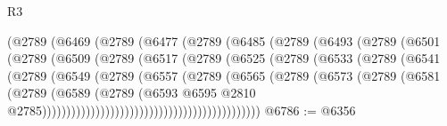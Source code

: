 \begin{lexlean}{R3}
\begin{coremodule}
                          (@2789
                            (@6469
                              (@2789
                                (@6477
                                  (@2789
                                    (@6485
                                      (@2789
                                        (@6493
                                          (@2789
                                            (@6501
                                              (@2789
                                                (@6509
                                                  (@2789
                                                    (@6517
                                                      (@2789
                                                        (@6525
                                                          (@2789
                                                            (@6533
                                                              (@2789
                                                                (@6541
                                                                  (@2789
                                                                    (@6549
                                                                      (@2789
                                                                        (@6557
                                                                          (@2789
                                                                            (@6565
                                                                              (@2789
                                                                                (@6573
                                                                                  (@2789
                                                                                    (@6581
                                                                                      (@2789
                                                                                        (@6589
                                                                                          (@2789
                                                                                            (@6593
                                                                                              @6595
                                                                                              @2810
                                                                                              @2785)))))))))))))))))))))))))))))))))))))))))))))
@6786 := @6356

\end{coremodule}
\end{lexlean}

